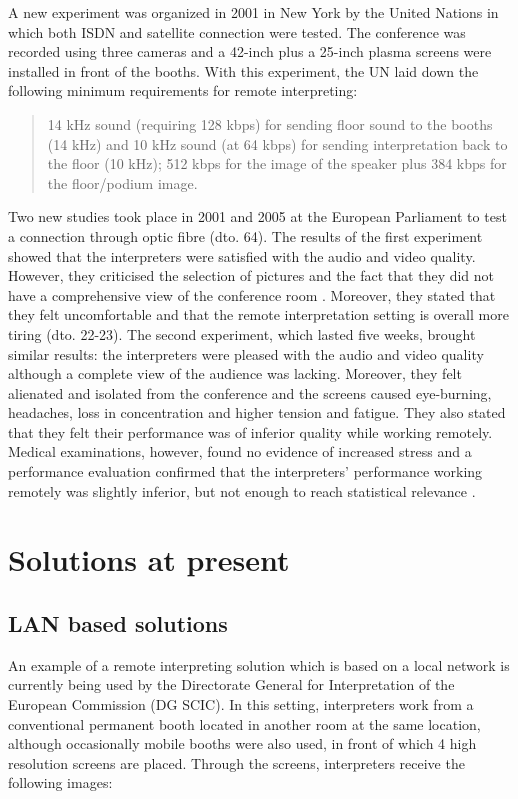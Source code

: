 \documentclass[output=paper]{langsci/langscibook}
\begin{document}
A new experiment was organized in 2001 in New York by the United Nations in which both \textsc{ISDN} and satellite connection were tested. The conference was recorded using three cameras and a 42-inch plus a 25-inch plasma screens were installed in front of the booths. With this experiment, the \textsc{UN} laid down the following minimum requirements for remote interpreting:

\begin{quote}
14 kHz sound (requiring 128 kbps) for sending floor sound to the booths (14 kHz) and 10 kHz sound (at 64 kbps) for sending interpretation back to the floor (10 kHz); 512 kbps for the image of the speaker plus 384 kbps for the floor/podium image.\citep[63]{Mouzourakis2006}
\end{quote}

Two new studies took place in 2001 and 2005 at the European Parliament to test a connection through optic fibre (dto. 64). The results of the first experiment showed that the interpreters were satisfied with the audio and video quality. However, they criticised the selection of pictures and the fact that they did not have a comprehensive view of the conference room \citep[19-21]{Europarl2001}. Moreover, they stated that they felt uncomfortable and that the remote interpretation setting is overall more tiring (dto. 22-23). The second experiment, which lasted five weeks, brought similar results: the interpreters were pleased with the audio and video quality although a complete view of the audience was lacking. Moreover, they felt alienated and isolated from the conference and the screens caused eye-burning, headaches, loss in concentration and higher tension and fatigue. They also stated that they felt their performance was of inferior quality while working remotely. Medical examinations, however, found no evidence of increased stress and a performance evaluation confirmed that the interpreters’ performance working remotely was slightly inferior, but not enough to reach statistical relevance \citep[225-243]{Roziner2010}.

\section{Solutions at present}
\label{sec:ziegler:04}
\subsection{LAN based solutions} 
\label{sub:ziegler:4.1}
An example of a remote interpreting solution which is based on a local network is currently being used by the Directorate General for Interpretation of the European Commission (\textsc{DG SCIC}). In this setting, interpreters work from a conventional permanent booth located in another room at the same location, although occasionally mobile booths were also used, in front of which 4 high resolution screens are placed. Through the screens, interpreters receive the following images:
\end{document}
